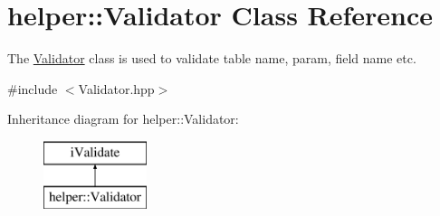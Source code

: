 \hypertarget{classhelper_1_1_validator}{}\section{helper\+::Validator Class Reference}
\label{classhelper_1_1_validator}


The \mbox{\hyperlink{classhelper_1_1_validator}{Validator}} class is used to validate table name, param, field name etc.  




{\ttfamily \#include $<$Validator.\+hpp$>$}

Inheritance diagram for helper\+::Validator\+:\begin{figure}[H]
\begin{center}
\leavevmode
\includegraphics[height=2.000000cm]{classhelper_1_1_validator}
\end{center}
\end{figure}
